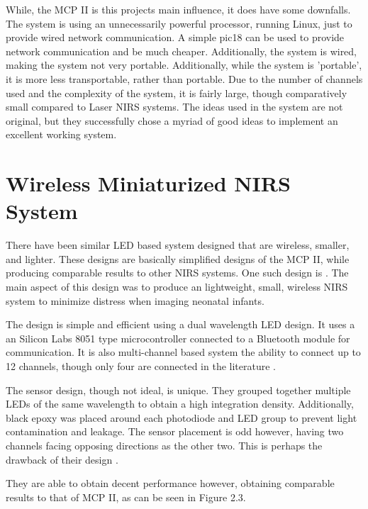 While, the MCP II is this projects main influence, it does have some downfalls. The system is using an unnecessarily powerful processor, running Linux, just to provide wired network communication. A simple pic18 can be used to provide network communication and be much cheaper. Additionally, the system is wired, making the system not very portable. Additionally, while the system is 'portable', it is more less transportable, rather than portable. Due to the number of channels used and the complexity of the system, it is fairly large, though comparatively small compared to Laser NIRS systems. The ideas used in the system are not original, but they successfully chose a myriad of good ideas to implement an excellent working system.

\section{Wireless Miniaturized NIRS System}

There have been similar LED based system designed that are wireless, smaller, and lighter. These designs are basically simplified designs of the MCP II,  while producing comparable results to other NIRS systems. One such design is \cite{mini08}. The main aspect of this design was to produce an lightweight, small, wireless NIRS system to minimize distress when imaging neonatal infants.

The design is simple and efficient using a dual wavelength LED design. It uses a an Silicon Labs 8051 type microcontroller connected to a Bluetooth module for communication. It is also multi-channel based system the ability to connect up to 12 channels, though only four are connected in the literature \cite{mini08}.

The sensor design, though not ideal, is unique. They grouped together multiple LEDs of the same wavelength to obtain a high integration density. Additionally, black epoxy was placed around each photodiode and LED group to prevent light contamination and leakage. The sensor placement is odd however, having two channels facing opposing directions as the other two. This is perhaps the drawback of their design \cite{mini08}.

They are able to obtain decent performance however, obtaining comparable results to that of MCP II, as can be seen in Figure 2.3.

